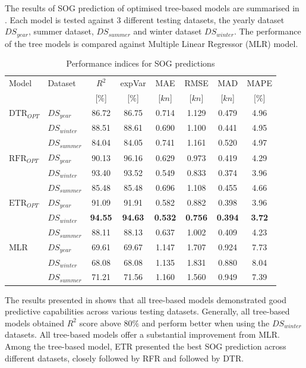 The results of SOG prediction of optimised tree-based models are summarised in . Each model is tested against 3 different testing datasets, the yearly dataset $DS_{year}$, summer dataset, $DS_{summer}$ and winter dataset $DS_{winter}$. The performance of the tree models is compared against Multiple Linear Regressor (MLR) model.

\begin{table}[ht]
    \footnotesize
    \centering
    {\begin{tabular}{ l l c c c c c c }
    \hline
    Model & Dataset & $R^2$ & expVar & MAE & RMSE & MAD & MAPE \\
    & & [$\%$] & [$\%$] & [$kn$] & [$kn$] & [$kn$] & [$\%$]  \\ 
    \hline
    $\text{DTR}_{OPT}$ & $DS_{year}$ & 86.72 & 86.75 & 0.714 & 1.129  & 0.479 & 4.96  \\
    & $DS_{winter}$ & 88.51 & 88.61 & 0.690 & 1.100 & 0.441 & 4.95 \\
    & $DS_{summer}$ & 84.04 & 84.05 & 0.741 & 1.161 & 0.520 & 4.97 \\
    $\text{RFR}_{OPT}$ & $DS_{year}$  & 90.13 & 96.16 & 0.629 & 0.973 & 0.419 & 4.29 \\
    & $DS_{winter}$ & 93.40 & 93.52 & 0.549 & 0.833 & 0.374 & 3.96 \\
    & $DS_{summer}$ & 85.48 & 85.48 & 0.696 & 1.108 & 0.455 & 4.66 \\
    $\text{ETR}_{OPT}$ & $DS_{year}$ & 91.09 & 91.91 & 0.582 & 0.882 & 0.398 & 3.96 \\
    & $DS_{winter}$ & \textbf{94.55} & \textbf{94.63} & \textbf{0.532} & \textbf{0.756} & \textbf{0.394} & \textbf{3.72} \\
    & $DS_{summer}$ & 88.11 & 88.13 & 0.637 & 1.002 & 0.409 & 4.23 \\
    MLR & $DS_{year}$ & 69.61 & 69.67 & 1.147 & 1.707 & 0.924 & 7.73 \\
    & $DS_{winter}$ & 68.08 & 68.08 & 1.135 & 1.831 & 0.880 & 8.04 \\
    & $DS_{summer}$ & 71.21 & 71.56 & 1.160 & 1.560 & 0.949 & 7.39 \\
    \hline
    \end{tabular}}
\caption{Performance indices for SOG predictions}\label{tbl:testing_dataset_sog_result}
\end{table}

The results presented in  shows that all tree-based models demonstrated good predictive capabilities across various testing datasets. Generally, all tree-based models obtained $R^2$ score above $80\%$ and perform better when using the $DS_{winter}$ datasets. All tree-based models offer a substantial improvement from MLR. Among the tree-based model, ETR presented the best SOG prediction across different datasets, closely followed by RFR and followed by  DTR.\\ 

